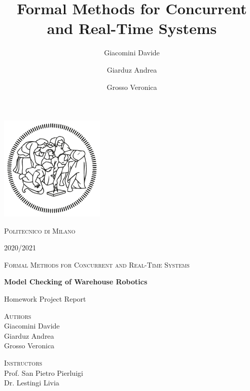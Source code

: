\documentclass[12pt,oneside,a4paper]{article}
\title{Formal Methods for Concurrent and Real-Time Systems}
\author{Giacomini Davide \and Giarduz Andrea \and Grosso Veronica}
\begin{document}
\begin{titlepage}
\begin{center}
        \vspace*{-1,5cm}
		\includegraphics[width=5cm]{resources/logo.png}
		
        \LARGE{{\scshape Politecnico di Milano}}
        
        \LARGE{}
        
        \LARGE{2020/2021}
        
        \vspace*{1cm}
        \Large{{\scshape Formal Methods for Concurrent and Real-Time Systems}}
        
        \vspace*{1cm}
        \Huge{\textbf{Model Checking of Warehouse Robotics}}
 
 		\Large{Homework Project Report}
        \vfill
        
        \vspace*{0,8cm}
        \Large{{\scshape Authors} \\ Giacomini Davide\\
        Giarduz Andrea\\
        Grosso Veronica
        }
            
        \vspace{1,2cm}
           
        \Large
        {\scshape Instructors}\\
        Prof. San Pietro Pierluigi\\
        Dr. Lestingi Livia
    \end{center}
\end{titlepage}

\setcounter{tocdepth}{3}
\tableofcontents
\listoffigures
{}
\listoftables
{}

\newpage
{}






\printbibliography{}
\end{document}
